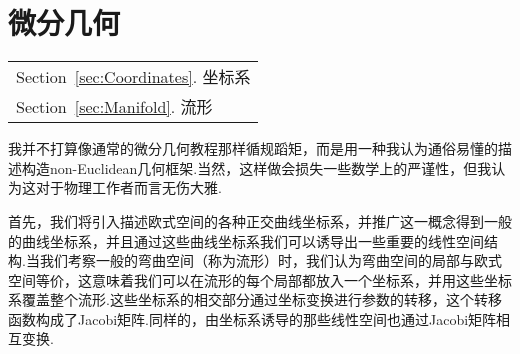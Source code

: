 \part{微分几何}\label{Part:Differential_Geometry}
			\begin{margintable}\vspace{1.4in}\footnotesize
				\begin{tabularx}{\marginparwidth}{|X}
					Section~\ref{sec:Coordinates}. 坐标系\\
					Section~\ref{sec:Manifold}. 流形\\
				\end{tabularx}
			\end{margintable}
	我并不打算像通常的微分几何教程那样循规蹈矩，而是用一种我认为通俗易懂的描述构造non-Euclidean几何框架.当然，这样做会损失一些数学上的严谨性，但我认为这对于物理工作者而言无伤大雅.

	首先，我们将引入描述欧式空间的各种正交曲线坐标系，并推广这一概念得到一般的曲线坐标系，并且通过这些曲线坐标系我们可以诱导出一些重要的线性空间结构.当我们考察一般的弯曲空间（称为流形）时，我们认为弯曲空间的局部与欧式空间等价，这意味着我们可以在流形的每个局部都放入一个坐标系，并用这些坐标系覆盖整个流形.这些坐标系的相交部分通过坐标变换进行参数的转移，这个转移函数构成了Jacobi矩阵.同样的，由坐标系诱导的那些线性空间也通过Jacobi矩阵相互变换.
	